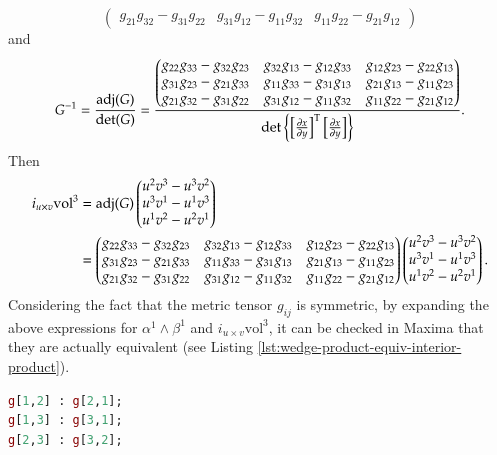 \documentclass[11pt, a4paper]{book}
\begin{document}
\begin{enumerate}
\begin{itemize}
\begin{Proof}
\begin{equation*}
\begin{pmatrix}
          g_{21}g_{32} - g_{31}g_{22} & g_{31}g_{12} - g_{11}g_{32} & g_{11}g_{22} -
          g_{21}g_{12}
        \end{pmatrix}
      \end{equation*}
      and
      \begin{equation*}
        G^{-1} = \frac{\operatorname{adj}(G)}{\det(G)} = \frac{\begin{pmatrix}
          g_{22}g_{33} - g_{32}g_{23} & g_{32}g_{13} - g_{12}g_{33} & g_{12}g_{23} -
          g_{22}g_{13} \\
          g_{31}g_{23} - g_{21}g_{33} & g_{11}g_{33} - g_{31}g_{13} & g_{21}g_{13} -
          g_{11}g_{23} \\
          g_{21}g_{32} - g_{31}g_{22} & g_{31}g_{12} - g_{11}g_{32} & g_{11}g_{22} -
          g_{21}g_{12}
        \end{pmatrix}}{\det\left\{\left[ \frac{\partial x}{\partial y} \right]^{\mathrm{T}}
          \left[ \frac{\partial x}{\partial y} \right]\right\}}.
    \end{equation*}
    Then
    \begin{align*}
      i_{u\times v}\mathrm{vol}^3
      &= \operatorname{adj}(G) \begin{pmatrix}
        u^2v^3-u^3v^2 \\
        u^3v^1-u^1v^3 \\
        u^1v^2-u^2v^1
      \end{pmatrix} \\
      &= \begin{pmatrix}
        g_{22}g_{33} - g_{32}g_{23} & g_{32}g_{13} - g_{12}g_{33} & g_{12}g_{23} -
        g_{22}g_{13} \\
        g_{31}g_{23} - g_{21}g_{33} & g_{11}g_{33} - g_{31}g_{13} & g_{21}g_{13} -
        g_{11}g_{23} \\
        g_{21}g_{32} - g_{31}g_{22} & g_{31}g_{12} - g_{11}g_{32} & g_{11}g_{22} -
        g_{21}g_{12}
      \end{pmatrix} \begin{pmatrix}
        u^2v^3-u^3v^2 \\
        u^3v^1-u^1v^3 \\
        u^1v^2-u^2v^1
      \end{pmatrix}.
    \end{align*}
    Considering the fact that the metric tensor $g_{ij}$ is symmetric, by expanding the
    above expressions for $\alpha^1 \wedge \beta^1$ and $i_{u\times v}\mathrm{vol}^3$, it
    can be checked in Maxima that they are actually equivalent (see Listing
    \ref{lst:wedge-product-equiv-interior-product}).
    \begin{lstlisting}[caption={Verify the equivalence between the wedge product of two
        1-forms and the interior product of the pseudo volume 3-form with respect to the
        cross product of the two tangent vectors associated with the two 1-forms.},
      label={lst:wedge-product-equiv-interior-product}, language=maxima]
g[1,2] : g[2,1];
g[1,3] : g[3,1];
g[2,3] : g[3,2];


\end{lstlisting}
\end{Proof}
\end{itemize}
\end{enumerate}
\end{document}
